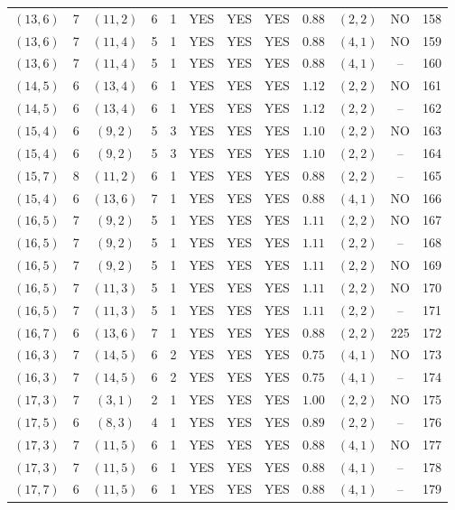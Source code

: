 \begin{longtable}{|c|c|c|c|c|c|c|c|c|c|c|c|}
$(13,6)$ & 7 & $(11,2)$ & 6 & 1 & YES & YES & YES & $0.88$ & $(2,2)$ & NO & 158\\
$(13,6)$ & 7 & $(11,4)$ & 5 & 1 & YES & YES & YES & $0.88$ & $(4,1)$ & NO & 159\\
$(13,6)$ & 7 & $(11,4)$ & 5 & 1 & YES & YES & YES & $0.88$ & $(4,1)$ & -- & 160\\
$(14,5)$ & 6 & $(13,4)$ & 6 & 1 & YES & YES & YES & $1.12$ & $(2,2)$ & NO & 161\\
$(14,5)$ & 6 & $(13,4)$ & 6 & 1 & YES & YES & YES & $1.12$ & $(2,2)$ & -- & 162\\
$(15,4)$ & 6 & $(9,2)$ & 5 & 3 & YES & YES & YES & $1.10$ & $(2,2)$ & NO & 163\\
$(15,4)$ & 6 & $(9,2)$ & 5 & 3 & YES & YES & YES & $1.10$ & $(2,2)$ & -- & 164\\
$(15,7)$ & 8 & $(11,2)$ & 6 & 1 & YES & YES & YES & $0.88$ & $(2,2)$ & -- & 165\\
$(15,4)$ & 6 & $(13,6)$ & 7 & 1 & YES & YES & YES & $0.88$ & $(4,1)$ & NO & 166\\
$(16,5)$ & 7 & $(9,2)$ & 5 & 1 & YES & YES & YES & $1.11$ & $(2,2)$ & NO & 167\\
$(16,5)$ & 7 & $(9,2)$ & 5 & 1 & YES & YES & YES & $1.11$ & $(2,2)$ & -- & 168\\
$(16,5)$ & 7 & $(9,2)$ & 5 & 1 & YES & YES & YES & $1.11$ & $(2,2)$ & NO & 169\\
$(16,5)$ & 7 & $(11,3)$ & 5 & 1 & YES & YES & YES & $1.11$ & $(2,2)$ & NO & 170\\
$(16,5)$ & 7 & $(11,3)$ & 5 & 1 & YES & YES & YES & $1.11$ & $(2,2)$ & -- & 171\\
$(16,7)$ & 6 & $(13,6)$ & 7 & 1 & YES & YES & YES & $0.88$ & $(2,2)$ & 225 & 172\\
$(16,3)$ & 7 & $(14,5)$ & 6 & 2 & YES & YES & YES & $0.75$ & $(4,1)$ & NO & 173\\
$(16,3)$ & 7 & $(14,5)$ & 6 & 2 & YES & YES & YES & $0.75$ & $(4,1)$ & -- & 174\\
$(17,3)$ & 7 & $(3,1)$ & 2 & 1 & YES & YES & YES & $1.00$ & $(2,2)$ & NO & 175\\
$(17,5)$ & 6 & $(8,3)$ & 4 & 1 & YES & YES & YES & $0.89$ & $(2,2)$ & -- & 176\\
$(17,3)$ & 7 & $(11,5)$ & 6 & 1 & YES & YES & YES & $0.88$ & $(4,1)$ & NO & 177\\
$(17,3)$ & 7 & $(11,5)$ & 6 & 1 & YES & YES & YES & $0.88$ & $(4,1)$ & -- & 178\\
$(17,7)$ & 6 & $(11,5)$ & 6 & 1 & YES & YES & YES & $0.88$ & $(4,1)$ & -- & 179\\

\end{longtable}
